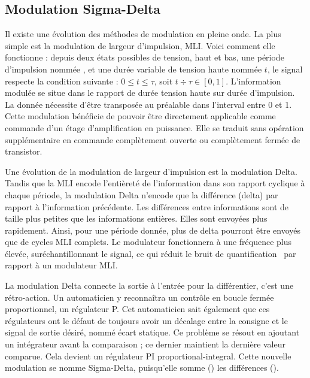 \documentclass[10pt, oneside, a4paper]{article}
\begin{document}
\subsection{Modulation Sigma-Delta}
\label{sec:sigmaDelta}
Il existe une évolution des méthodes de modulation en pleine onde.
La plus simple est la modulation de largeur d'impulsion, MLI.
Voici comment elle fonctionne : depuis deux états possibles de tension, haut et bas, une période d'impulsion nommée \tau{}, et une durée variable de tension haute nommée $t$, le signal respecte la condition suivante : $0 \leq t \leq \tau $, soit $t \div \tau \in [0,1]$.
L'information modulée se situe dans le rapport de durée tension haute sur durée d'impulsion.
La donnée nécessite d'être transposée au préalable dans l'interval entre 0 et 1.
Cette modulation bénéficie de pouvoir être directement applicable comme commande d'un étage d'amplification en puissance.
Elle se traduit sans opération supplémentaire en commande complètement ouverte ou complètement fermée de transistor.

Une évolution de la modulation de largeur d'impulsion est la modulation Delta.
Tandis que la MLI encode l'entièreté de l'information dans son rapport cyclique à chaque période, la modulation Delta n'encode que la différence (delta) par rapport à l'information précédente.
Les différences entre informations sont de taille plus petites que les informations entières.
Elles sont envoyées plus rapidement.
Ainsi, pour une période donnée, plus de delta pourront être envoyés que de cycles MLI complets.
Le modulateur fonctionnera à une fréquence plus élevée, suréchantillonnant le signal, ce qui réduit le bruit de quantification~\cite{gray1998quantization} par rapport à un modulateur MLI.

La modulation Delta connecte la sortie à l'entrée pour la différentier, c'est une rétro-action.
Un automaticien y reconnaîtra un contrôle en boucle fermée proportionnel, un régulateur P.
Cet automaticien sait également que ces régulateurs ont le défaut de toujours avoir un décalage entre la consigne et le signal de sortie désiré, nommé \og{}écart statique\fg{}.
Ce problème se résout en ajoutant un intégrateur avant la comparaison ; ce dernier maintient la dernière valeur comparue.
Cela devient un régulateur PI \og{}proportional-integral\fg{}.
Cette nouvelle modulation se nomme Sigma-Delta, puisqu'elle somme (\Sigma{}) les différences (\Delta{}).
\end{document}
